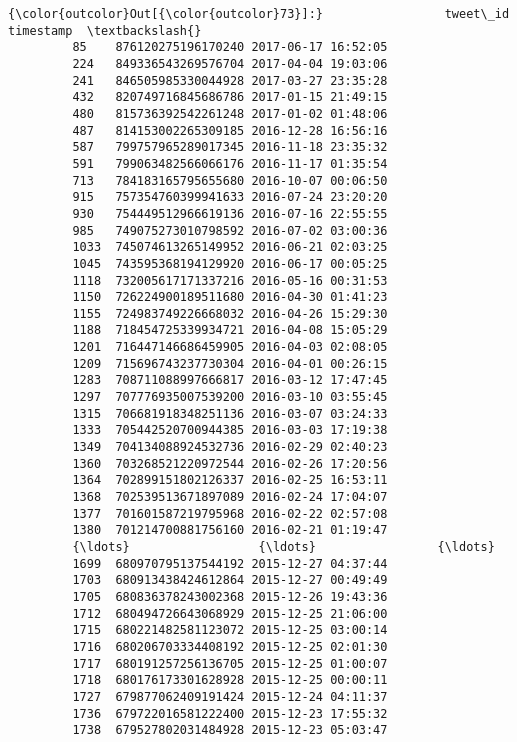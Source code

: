 \documentclass[11pt]{article}
\begin{document}
\begin{Verbatim}[commandchars=\\\{\}]
{\color{outcolor}Out[{\color{outcolor}73}]:}                 tweet\_id           timestamp  \textbackslash{}
         85    876120275196170240 2017-06-17 16:52:05   
         224   849336543269576704 2017-04-04 19:03:06   
         241   846505985330044928 2017-03-27 23:35:28   
         432   820749716845686786 2017-01-15 21:49:15   
         480   815736392542261248 2017-01-02 01:48:06   
         487   814153002265309185 2016-12-28 16:56:16   
         587   799757965289017345 2016-11-18 23:35:32   
         591   799063482566066176 2016-11-17 01:35:54   
         713   784183165795655680 2016-10-07 00:06:50   
         915   757354760399941633 2016-07-24 23:20:20   
         930   754449512966619136 2016-07-16 22:55:55   
         985   749075273010798592 2016-07-02 03:00:36   
         1033  745074613265149952 2016-06-21 02:03:25   
         1045  743595368194129920 2016-06-17 00:05:25   
         1118  732005617171337216 2016-05-16 00:31:53   
         1150  726224900189511680 2016-04-30 01:41:23   
         1155  724983749226668032 2016-04-26 15:29:30   
         1188  718454725339934721 2016-04-08 15:05:29   
         1201  716447146686459905 2016-04-03 02:08:05   
         1209  715696743237730304 2016-04-01 00:26:15   
         1283  708711088997666817 2016-03-12 17:47:45   
         1297  707776935007539200 2016-03-10 03:55:45   
         1315  706681918348251136 2016-03-07 03:24:33   
         1333  705442520700944385 2016-03-03 17:19:38   
         1349  704134088924532736 2016-02-29 02:40:23   
         1360  703268521220972544 2016-02-26 17:20:56   
         1364  702899151802126337 2016-02-25 16:53:11   
         1368  702539513671897089 2016-02-24 17:04:07   
         1377  701601587219795968 2016-02-22 02:57:08   
         1380  701214700881756160 2016-02-21 01:19:47   
         {\ldots}                  {\ldots}                 {\ldots}   
         1699  680970795137544192 2015-12-27 04:37:44   
         1703  680913438424612864 2015-12-27 00:49:49   
         1705  680836378243002368 2015-12-26 19:43:36   
         1712  680494726643068929 2015-12-25 21:06:00   
         1715  680221482581123072 2015-12-25 03:00:14   
         1716  680206703334408192 2015-12-25 02:01:30   
         1717  680191257256136705 2015-12-25 01:00:07   
         1718  680176173301628928 2015-12-25 00:00:11   
         1727  679877062409191424 2015-12-24 04:11:37   
         1736  679722016581222400 2015-12-23 17:55:32   
         1738  679527802031484928 2015-12-23 05:03:47   

\end{Verbatim}
\end{document}
